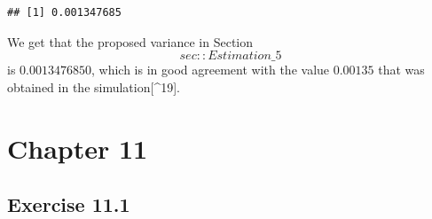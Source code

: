 \documentclass[
]{krantz}
\makeatletter
\newenvironment{Shaded}{\begin{snugshade}}{\end{snugshade}}
\newcommand{\DecValTok}[1]{\textcolor[rgb]{0.00,0.00,0.81}{#1}}
\newcommand{\KeywordTok}[1]{\textcolor[rgb]{0.13,0.29,0.53}{\textbf{#1}}}
\newcommand{\NormalTok}[1]{#1}
\newcommand{\OperatorTok}[1]{\textcolor[rgb]{0.81,0.36,0.00}{\textbf{#1}}}
\newcommand{\StringTok}[1]{\textcolor[rgb]{0.31,0.60,0.02}{#1}}
\newenvironment{kframe}{%
\medskip{}
\setlength{\fboxsep}{.8em}
 \def\at@end@of@kframe{}%
 \ifinner\ifhmode%
  \def\at@end@of@kframe{\end{minipage}}%
  \begin{minipage}{\columnwidth}%
 \fi\fi%
 \def\FrameCommand##1{\hskip\@totalleftmargin \hskip-\fboxsep
 \colorbox{shadecolor}{##1}\hskip-\fboxsep
     \hskip-\linewidth \hskip-\@totalleftmargin \hskip\columnwidth}%
 \MakeFramed {\advance\hsize-\width
   \@totalleftmargin\z@ \linewidth\hsize
   \@setminipage}}%
 {\par\unskip\endMakeFramed%
 \at@end@of@kframe}
\renewenvironment{Shaded}{\begin{kframe}}{\end{kframe}}
\theoremstyle{definition}
\theoremstyle{definition}
\theoremstyle{definition}
\theoremstyle{remark}
\makeatother
\begin{document}
\begin{enumerate}
\begin{Shaded}
\end{Shaded}

\begin{verbatim}
## [1] 0.001347685
\end{verbatim}

  We get that the proposed variance in Section~\[sec::Estimation\_5\] is
  \(0.0013476850\), which is in good agreement with the value \(0.00135\) that
  was obtained in the simulation{[}\^{}19{]}.
\end{enumerate}

\hypertarget{chapter-11}{%
\section*{Chapter 11}\label{chapter-11}}


\hypertarget{exercise-11.1}{%
\subsection*{Exercise 11.1}\label{exercise-11.1}}
\end{document}

